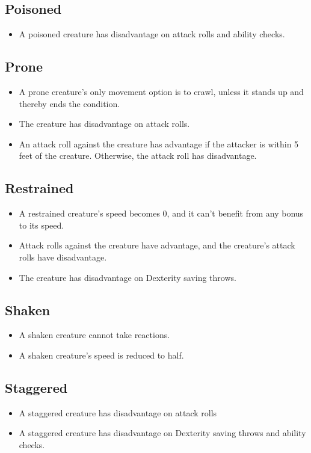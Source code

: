 \subsection{Poisoned\label{condition:poisoned}}
\begin{itemize}
\item A poisoned creature has disadvantage on attack rolls and ability checks.
\end{itemize}

\subsection{Prone\label{condition:prone}}
\begin{itemize}
\item A prone creature's only movement option is to crawl, unless it stands up and thereby ends the condition.
\item The creature has disadvantage on attack rolls.
\item An attack roll against the creature has advantage if the attacker is within 5 feet of the creature. Otherwise, the attack roll has disadvantage.
\end{itemize}

\subsection{Restrained\label{condition:restrained}}
\begin{itemize}
\item A restrained creature's speed becomes 0, and it can't benefit from any bonus to its speed.
\item Attack rolls against the creature have advantage, and the creature's attack rolls have disadvantage.
\item The creature has disadvantage on Dexterity saving throws.
\end{itemize}

\subsection{Shaken\label{condition:shaken}}
\begin{itemize}
	\item A shaken creature cannot take reactions.
	\item A shaken creature's speed is reduced to half.
\end{itemize}

\subsection{Staggered\label{condition:staggered}}
\begin{itemize}
	\item A staggered creature has disadvantage on attack rolls 
	\item A staggered creature has disadvantage on Dexterity saving throws and ability checks.
\end{itemize}

